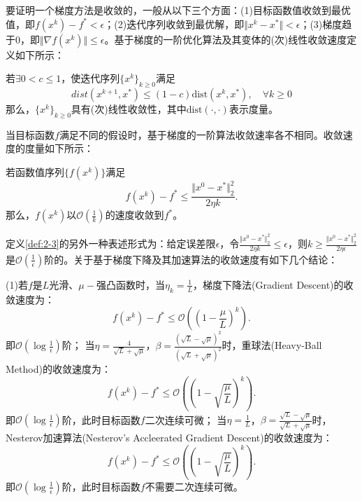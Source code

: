 要证明一个梯度方法是收敛的，一般从以下三个方面：(1)目标函数值收敛到最优值，即$f(x^k)-f^*<\epsilon$；(2)迭代序列收敛到最优解，即$\Vert{x^k-x^*}\Vert<\epsilon$；(3)梯度趋于0，即$\Vert{\nabla{f(x^k)}}\Vert\leq \epsilon$。基于梯度的一阶优化算法及其变体的(次)线性收敛速度定义如下所示：
\begin{definition} \label{def:2-2}
	若$\exists{0 < c \leq 1}$，使迭代序列$\{x^k\}_{k\geq{0}}$满足
	\begin{equation} 
		dist(x^{k+1}, x^*)\leq(1-c){\text{dist}(x^k, x^*)},\quad \forall{k\geq{0}}
	\end{equation}
	那么，$\{x^k\}_{k\geq{0}}$具有(次)线性收敛性，其中$\text{dist}(\cdot,\cdot)$表示度量。
\end{definition}
当目标函数$f$满足不同的假设时，基于梯度的一阶算法收敛速率各不相同。收敛速度的度量如下所示：
\begin{definition} \label{def:2-3}
	若函数值序列$\{f(x^k)\}$满足
	\begin{equation}
		f(x^k)-f^*\leq{\frac{\Vert x^0 - x^* \Vert^2_2}{2\eta{k}}}.
	\end{equation}
	那么，$f(x^k)$以$\mathcal{O}(\frac{1}{k})$的速度收敛到$f^*$。
\end{definition}

定义\ref{def:2-3}的另外一种表述形式为：给定误差限$\epsilon$，令$\frac{\Vert x^0 - x^* \Vert^2_2}{2\eta{k}}\leq{\epsilon}$，则$k\geq\frac{\Vert x^0 - x^* \Vert^2_2}{2\eta{\epsilon}}$是$\mathcal{O}(\frac{1}{\epsilon})$阶的。关于基于梯度下降及其加速算法的收敛速度有如下几个结论：

(1)若$f$是$L$光滑、$\mu-$强凸函数时，当$\eta_k=\frac{1}{L}$，梯度下降法(Gradient Descent)的收敛速度为：
\begin{equation}
	f(x^k)-f^*\leq{\mathcal{O}((1-\frac{\mu}{L})^k)}.
\end{equation}即$\mathcal{O}(\log{\frac{1}{\epsilon}})$阶；
当$\eta=\frac{4}{\sqrt{L}+\sqrt{\mu}}$，$\beta=\frac{(\sqrt{L}-\sqrt{\mu})^2}{(\sqrt{L}+\sqrt{\mu})^2}$时，重球法(Heavy-Ball Method)的收敛速度为：
\begin{equation}
	f(x^k)-f^*\leq{\mathcal{O}((1-\sqrt{\frac{\mu}{L}})^k)}.
\end{equation}即$\mathcal{O}(\log{\frac{1}{\epsilon}})$阶，此时目标函数$f$二次连续可微；
当$\eta=\frac{1}{L}$，$\beta=\frac{\sqrt{L}-\sqrt{\mu}}{\sqrt{L}+\sqrt{\mu}}$时，Nesterov加速算法(Nesterov's Accleerated Gradient Descent)的收敛速度为：
\begin{equation}
	f(x^k)-f^*\leq{\mathcal{O}((1-\sqrt{\frac{\mu}{L}})^k)}.
\end{equation}即$\mathcal{O}(\log{\frac{1}{\epsilon}})$阶，此时目标函数$f$不需要二次连续可微。


